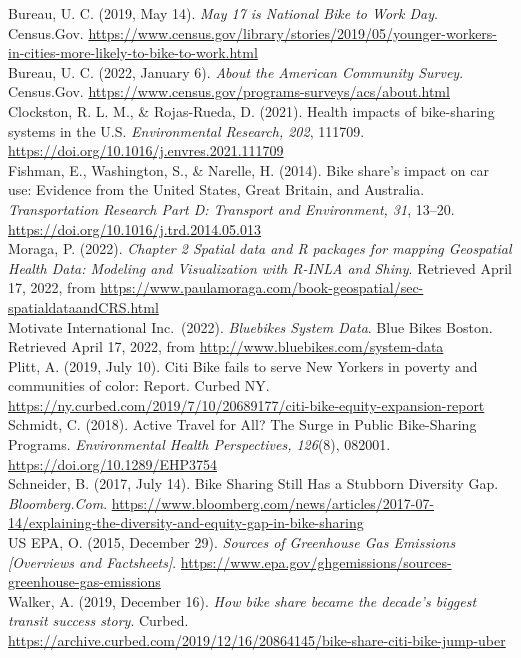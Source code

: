 \documentclass[
  12pt,
]{article}
\begin{document}
Bureau, U. C. (2019, May 14). \emph{May 17 is National Bike to Work
Day}. Census.Gov.
\url{https://www.census.gov/library/stories/2019/05/younger-workers-in-cities-more-likely-to-bike-to-work.html}\\
Bureau, U. C. (2022, January 6). \emph{About the American Community
Survey}. Census.Gov.
\url{https://www.census.gov/programs-surveys/acs/about.html}\\
Clockston, R. L. M., \& Rojas-Rueda, D. (2021). Health impacts of
bike-sharing systems in the U.S. \emph{Environmental Research, 202},
111709. \url{https://doi.org/10.1016/j.envres.2021.111709}\\
Fishman, E., Washington, S., \& Narelle, H. (2014). Bike share's impact
on car use: Evidence from the United States, Great Britain, and
Australia. \emph{Transportation Research Part D: Transport and
Environment, 31}, 13--20.
\url{https://doi.org/10.1016/j.trd.2014.05.013}\\
Moraga, P. (2022). \emph{Chapter 2 Spatial data and R packages for
mapping \textbar{} Geospatial Health Data: Modeling and Visualization
with R-INLA and Shiny}. Retrieved April 17, 2022, from
\url{https://www.paulamoraga.com/book-geospatial/sec-spatialdataandCRS.html}\\
Motivate International Inc.~(2022). \emph{Bluebikes System Data}. Blue
Bikes Boston. Retrieved April 17, 2022, from
\url{http://www.bluebikes.com/system-data}\\
Plitt, A. (2019, July 10). Citi Bike fails to serve New Yorkers in
poverty and communities of color: Report. Curbed NY.
\url{https://ny.curbed.com/2019/7/10/20689177/citi-bike-equity-expansion-report}\\
Schmidt, C. (2018). Active Travel for All? The Surge in Public
Bike-Sharing Programs. \emph{Environmental Health Perspectives, 126}(8),
082001. \url{https://doi.org/10.1289/EHP3754}\\
Schneider, B. (2017, July 14). Bike Sharing Still Has a Stubborn
Diversity Gap. \emph{Bloomberg.Com}.
\url{https://www.bloomberg.com/news/articles/2017-07-14/explaining-the-diversity-and-equity-gap-in-bike-sharing}\\
US EPA, O. (2015, December 29). \emph{Sources of Greenhouse Gas
Emissions {[}Overviews and Factsheets{]}}.
\url{https://www.epa.gov/ghgemissions/sources-greenhouse-gas-emissions}\\
Walker, A. (2019, December 16). \emph{How bike share became the decade's
biggest transit success story}. Curbed.
\url{https://archive.curbed.com/2019/12/16/20864145/bike-share-citi-bike-jump-uber}\\
\end{document}
